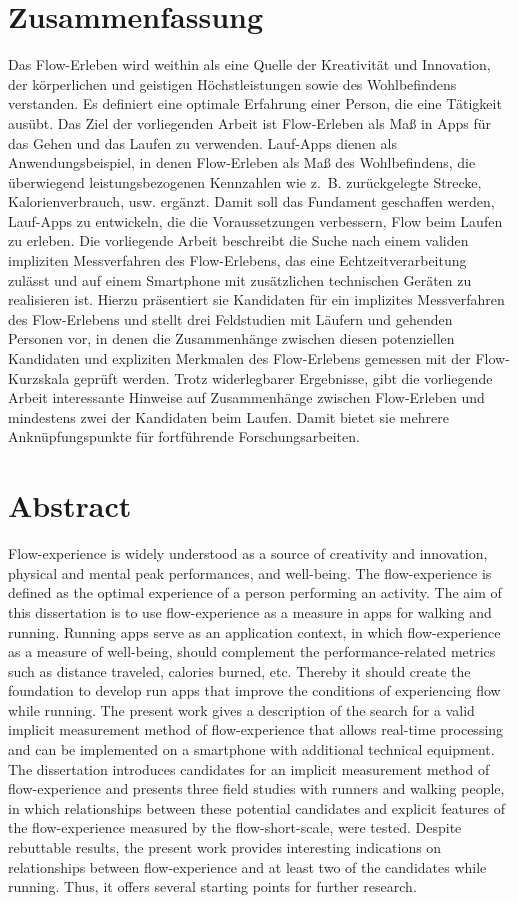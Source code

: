 \section*{Zusammenfassung}
Das Flow-Erleben wird weithin als eine Quelle der Kreativität und Innovation, der körperlichen und geistigen Höchstleistungen sowie des Wohlbefindens verstanden. Es definiert eine optimale Erfahrung einer Person, die eine Tätigkeit ausübt. Das Ziel der vorliegenden Arbeit ist Flow-Erleben als Maß in Apps für das Gehen und das Laufen zu verwenden. Lauf-Apps dienen als Anwendungsbeispiel, in denen Flow-Erleben als Maß des Wohlbefindens, die überwiegend leistungsbezogenen Kennzahlen wie z.~B. zurückgelegte Strecke, Kalorienverbrauch, usw. ergänzt. Damit soll das Fundament geschaffen werden, Lauf-Apps zu entwickeln, die die Voraussetzungen verbessern, Flow beim Laufen zu erleben. Die vorliegende Arbeit beschreibt die Suche nach einem validen impliziten Messverfahren des Flow-Erlebens, das eine Echtzeitverarbeitung zulässt und auf einem Smartphone mit zusätzlichen technischen Geräten zu realisieren ist. Hierzu präsentiert sie Kandidaten für ein implizites Messverfahren des Flow-Erlebens und stellt drei Feldstudien mit Läufern und gehenden Personen vor, in denen die Zusammenhänge zwischen diesen potenziellen Kandidaten und expliziten Merkmalen des Flow-Erlebens gemessen mit der Flow-Kurzskala geprüft werden. Trotz widerlegbarer Ergebnisse, gibt die vorliegende Arbeit interessante Hinweise auf Zusammenhänge zwischen Flow-Erleben und mindestens zwei der Kandidaten beim Laufen. Damit bietet sie mehrere Anknüpfungspunkte für fortführende Forschungsarbeiten. 
\pagebreak

\section*{Abstract}
Flow-experience is widely understood as a source of creativity and innovation, physical and mental peak performances, and well-being. The flow-experience is defined as the optimal experience of a person performing an activity. The aim of this dissertation is to use flow-experience as a measure in apps for walking and running. Running apps serve as an application context, in which flow-experience as a measure of well-being, should complement the performance-related metrics such as distance traveled, calories burned, etc. Thereby it should create the foundation to develop run apps that improve the conditions of experiencing flow while running. The present work gives a description of the search for a valid implicit measurement method of flow-experience that allows real-time processing and can be implemented on a smartphone with additional technical equipment. The dissertation introduces candidates for an implicit measurement method of flow-experience and presents three field studies with runners and walking people, in which relationships between these potential candidates and explicit features of the flow-experience measured by the flow-short-scale, were tested. Despite rebuttable results, the present work provides interesting indications on relationships between flow-experience and at least two of the candidates while running. Thus, it offers several starting points for further research. 